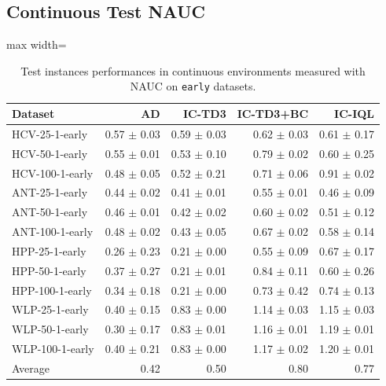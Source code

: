 \documentclass{article}
\begin{document}
\subsection{Continuous Test NAUC}
\begin{table}[ht]
    \label{tab:}
    \begin{center}
    \caption{Test instances performances in continuous environments measured with NAUC on \texttt{early} datasets.}
    \begin{small}
    \begin{adjustbox}{max width=\columnwidth}
				\begin{tabular}{l|rrrr}
		\toprule
	\textbf{Dataset} & \textbf{AD} & \textbf{IC-TD3} & \textbf{IC-TD3+BC} & \textbf{IC-IQL}\\
\midrule
HCV-25-1-early & 0.57 $\pm$ 0.03 & 0.59 $\pm$ 0.03 & 0.62 $\pm$ 0.03 & 0.61 $\pm$ 0.17\\
HCV-50-1-early & 0.55 $\pm$ 0.01 & 0.53 $\pm$ 0.10 & 0.79 $\pm$ 0.02 & 0.60 $\pm$ 0.25\\
HCV-100-1-early & 0.48 $\pm$ 0.05 & 0.52 $\pm$ 0.21 & 0.71 $\pm$ 0.06 & 0.91 $\pm$ 0.02\\
ANT-25-1-early & 0.44 $\pm$ 0.02 & 0.41 $\pm$ 0.01 & 0.55 $\pm$ 0.01 & 0.46 $\pm$ 0.09\\
ANT-50-1-early & 0.46 $\pm$ 0.01 & 0.42 $\pm$ 0.02 & 0.60 $\pm$ 0.02 & 0.51 $\pm$ 0.12\\
ANT-100-1-early & 0.48 $\pm$ 0.02 & 0.43 $\pm$ 0.05 & 0.67 $\pm$ 0.02 & 0.58 $\pm$ 0.14\\
HPP-25-1-early & 0.26 $\pm$ 0.23 & 0.21 $\pm$ 0.00 & 0.55 $\pm$ 0.09 & 0.67 $\pm$ 0.17\\
HPP-50-1-early & 0.37 $\pm$ 0.27 & 0.21 $\pm$ 0.01 & 0.84 $\pm$ 0.11 & 0.60 $\pm$ 0.26\\
HPP-100-1-early & 0.34 $\pm$ 0.18 & 0.21 $\pm$ 0.00 & 0.73 $\pm$ 0.42 & 0.74 $\pm$ 0.13\\
WLP-25-1-early & 0.40 $\pm$ 0.15 & 0.83 $\pm$ 0.00 & 1.14 $\pm$ 0.03 & 1.15 $\pm$ 0.03\\
WLP-50-1-early & 0.30 $\pm$ 0.17 & 0.83 $\pm$ 0.01 & 1.16 $\pm$ 0.01 & 1.19 $\pm$ 0.01\\
WLP-100-1-early & 0.40 $\pm$ 0.21 & 0.83 $\pm$ 0.00 & 1.17 $\pm$ 0.02 & 1.20 $\pm$ 0.01\\
\midrule
Average & 0.42 & 0.50 & 0.80 & 0.77\\
\end{tabular}
        \end{adjustbox}
    \end{small}
    \end{center}
    \vskip -0.1in
\end{table}
\end{document}
